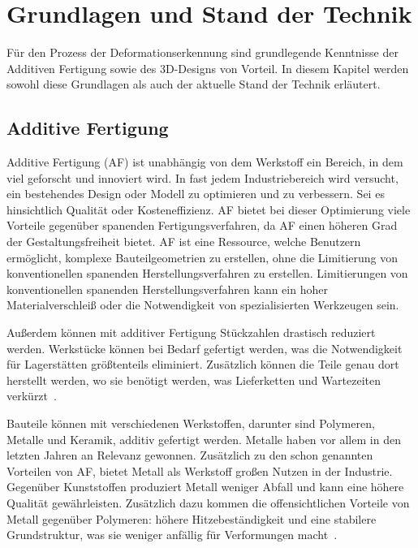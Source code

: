 \chapter{Grundlagen und Stand der Technik}

Für den Prozess der Deformationserkennung sind grundlegende Kenntnisse der 
Additiven Fertigung sowie des 3D-Designs von Vorteil. In diesem Kapitel 
werden sowohl diese Grundlagen als auch der aktuelle Stand der Technik 
erläutert.

\section{Additive Fertigung}

Additive Fertigung (AF) ist unabhängig von dem Werkstoff ein Bereich, in dem viel
geforscht und innoviert wird. In fast jedem Industriebereich wird versucht, ein
bestehendes Design oder Modell zu optimieren und zu verbessern.
Sei es hinsichtlich Qualität oder Kosteneffizienz. AF bietet bei 
dieser Optimierung viele Vorteile gegenüber spanenden Fertigungsverfahren, da 
AF einen höheren Grad der Gestaltungsfreiheit bietet. 
AF ist eine Ressource, welche Benutzern ermöglicht, komplexe 
Bauteilgeometrien zu erstellen, ohne die Limitierung von konventionellen spanenden 
Herstellungsverfahren zu erstellen. 
Limitierungen von konventionellen spanenden 
Herstellungsverfahren kann ein hoher Materialverschleiß oder die Notwendigkeit von 
spezialisierten Werkzeugen sein.\ \cite{Vafadar.2021} 

Außerdem können mit additiver Fertigung Stückzahlen drastisch reduziert werden.
Werkstücke können bei Bedarf gefertigt werden, was die Notwendigkeit für Lagerstätten
größtenteils eliminiert. Zusätzlich können die Teile genau dort herstellt werden, wo 
sie benötigt werden, was Lieferketten und Wartezeiten verkürzt~\cite{Calignano.2023}.

Bauteile können mit verschiedenen Werkstoffen, darunter sind Polymeren, Metalle und Keramik, 
additiv gefertigt werden.
Metalle haben vor allem in den letzten Jahren 
an Relevanz gewonnen. Zusätzlich zu den schon genannten Vorteilen von AF, 
bietet Metall als Werkstoff großen Nutzen in der Industrie. Gegenüber Kunststoffen
produziert Metall weniger Abfall und kann eine höhere Qualität gewährleisten.
Zusätzlich dazu kommen die offensichtlichen Vorteile von Metall gegenüber Polymeren: 
höhere Hitzebeständigkeit und eine stabilere Grundstruktur, was sie weniger anfällig 
für Verformungen macht~\cite{Gardner.2023}.

